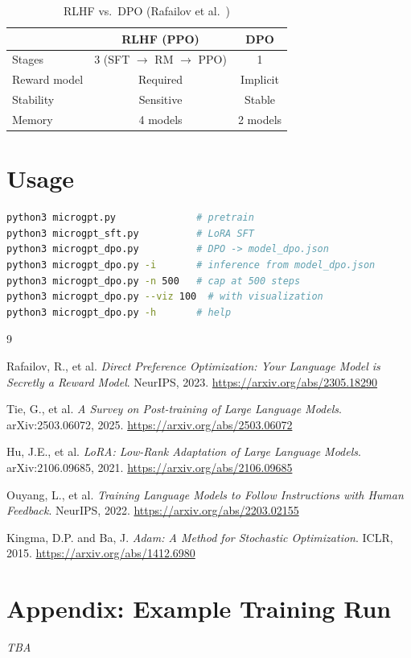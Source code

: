 \documentclass[11pt,a4paper]{article}
\begin{document}
\begin{table}[h]
\centering
\begin{tabular}{lcc}
\toprule
& \textbf{RLHF (PPO)} & \textbf{DPO} \\
\midrule
Stages & 3 (SFT $\to$ RM $\to$ PPO) & 1 \\
Reward model & Required & Implicit \\
Stability & Sensitive & Stable \\
Memory & 4 models & 2 models \\
\bottomrule
\end{tabular}
\caption{RLHF vs.\ DPO (Rafailov et al.~\cite{rafailov2023direct})}
\end{table}

\section{Usage}

\begin{lstlisting}[language=bash]
python3 microgpt.py              # pretrain
python3 microgpt_sft.py          # LoRA SFT
python3 microgpt_dpo.py          # DPO -> model_dpo.json
python3 microgpt_dpo.py -i       # inference from model_dpo.json
python3 microgpt_dpo.py -n 500   # cap at 500 steps
python3 microgpt_dpo.py --viz 100  # with visualization
python3 microgpt_dpo.py -h       # help
\end{lstlisting}

\begin{thebibliography}{9}

Rafailov, R., et al. \textit{Direct Preference Optimization: Your Language Model is Secretly a Reward Model}. NeurIPS, 2023.
\url{https://arxiv.org/abs/2305.18290}

Tie, G., et al. \textit{A Survey on Post-training of Large Language Models}. arXiv:2503.06072, 2025.
\url{https://arxiv.org/abs/2503.06072}

Hu, J.E., et al. \textit{LoRA: Low-Rank Adaptation of Large Language Models}. arXiv:2106.09685, 2021.
\url{https://arxiv.org/abs/2106.09685}

Ouyang, L., et al. \textit{Training Language Models to Follow Instructions with Human Feedback}. NeurIPS, 2022.
\url{https://arxiv.org/abs/2203.02155}

Kingma, D.P. and Ba, J. \textit{Adam: A Method for Stochastic Optimization}. ICLR, 2015.
\url{https://arxiv.org/abs/1412.6980}

\end{thebibliography}

\newpage
\section*{Appendix: Example Training Run}

\textit{TBA}
\end{document}
